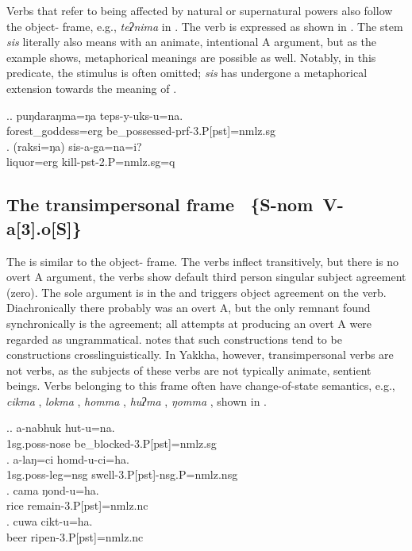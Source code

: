 	
Verbs that refer to being affected by natural or supernatural powers also follow the object- frame, e.g., \emph{teʔnima}  in  \Next[a].  The verb  is expressed as shown in \Next[b]. The stem \emph{sis} literally also means  with an animate, intentional A argument, but as the example shows, metaphorical meanings are possible as well. Notably, in this predicate, the stimulus is often omitted; \emph{sis} has undergone a metaphorical extension towards the meaning of .

\ex.\ag. puŋdaraŋma=ŋa  teps-y-uks-u=na.\\
forest\_goddess{\sc =erg} be\_possessed{\sc -prf-3.P[pst]=nmlz.sg}\\
\bg. (raksi=ŋa)  sis-a-ga=na=i?\\
		liquor{\sc =erg} kill{\sc -pst-2.P=nmlz.sg=q}\\


 
\subsection[The transimpersonal frame]{The transimpersonal frame %
\mbox{ \{S-{\sc nom} V-a[3].o[S]\}}\label{tr-imp}}


\noindent
The   is similar to the object- frame. The verbs inflect transitively, but there is no overt A argument, the verbs show default third person singular subject agreement (zero). The sole argument is in the  and triggers  object agreement on the verb. Diachronically there probably was  an overt A, but the only remnant found synchronically is the agreement; all attempts at producing an overt A were regarded as ungrammatical. \citet{Malchukov2008Split} notes that such constructions tend to be  constructions crosslinguistically. In Yakkha, however, transimpersonal verbs are not  verbs, as the subjects of these verbs are not typically animate, sentient beings. Verbs belonging to this frame often have change-of-state semantics, e.g., \emph{cikma} , \emph{lokma} , \emph{homma} , \emph{huʔma} , \emph{ŋomma} , shown in \Next. 
 
\ex.\ag. a-nabhuk hut-u=na.\\
 {\sc 1sg.poss-}nose be\_blocked{\sc -3.P[pst]=nmlz.sg} \\
\bg. a-laŋ=ci homd-u-ci=ha.\\
 {\sc 1sg.poss-}leg{\sc =nsg} swell{\sc -3.P[pst]-nsg.P=nmlz.nsg} \\
 \bg. cama ŋond-u=ha.\\
rice remain{\sc -3.P[pst]=nmlz.nc}\\
\bg. cuwa cikt-u=ha.\\
beer ripen{\sc -3.P[pst]=nmlz.nc}\\
 
